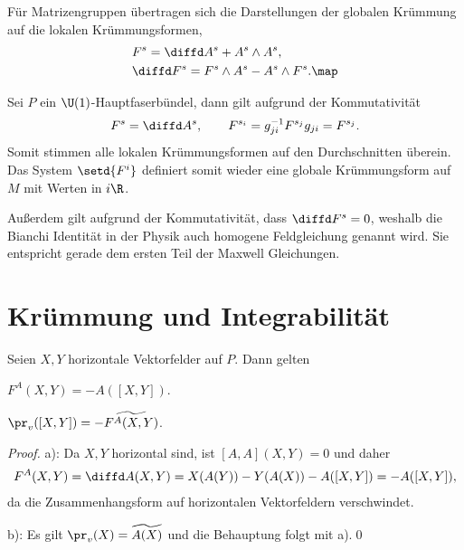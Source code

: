 \documentclass[%
	paper=a5,%
	fleqn,%
	DIV=18,%
	BCOR=0mm,
	fontsize=11pt,
	titlepage=false,%
	bibliography=totoc,
	DIV=18,%
	twoside=true,
	pdftitle=Riemannsche Geometrie,
	pdfauthor=Uwe Semmelmann,
	numbers=noendperiod]%
	{scrbook}
\begin{document}
\begin{rem}
Für Matrizengruppen übertragen sich die Darstellungen der globalen Krümmung auf
die lokalen Krümmungsformen,
\begin{align*}
&F^s = \diffd A^s + A^s\wedge A^s,\\
&\diffd F^s = F^s\wedge A^s - A^s \wedge F^s.\map
\end{align*}
\end{rem}

\begin{ex}
Sei $P$ ein $\U(1)$-Hauptfaserbündel, dann gilt aufgrund der Kommutativität
\begin{align*}
F^s = \diffd A^s,\qquad
F^{s_i} = g_{ji}^{-1}F^{s_j}g_{ji} = F^{s_j}.
\end{align*}
Somit stimmen alle lokalen Krümmungsformen auf den Durchschnitten überein. Das
System $\setd{F^i}$ definiert somit wieder eine globale Krümmungsform auf $M$
mit Werten in $i\R$.

Außerdem gilt aufgrund der Kommutativität, dass $\diffd F^s = 0$, weshalb die
Bianchi Identität in der Physik auch homogene Feldgleichung genannt wird. Sie
entspricht gerade dem ersten Teil der Maxwell Gleichungen.\bsp
\end{ex}


\section{Krümmung und Integrabilität}

\begin{prop}
\label{prop:Krümmung-v-Projektion}
Seien $X,Y$ horizontale Vektorfelder auf $P$. Dann gelten
\begin{propenum}
\item $F^A(X,Y) = -A([X,Y])$.
\item $\pr_v([X,Y]) = -\widetilde{F^A(X,Y)}$.\fish
\end{propenum}
\end{prop}
\begin{proof}
a): Da $X,Y$ horizontal sind, ist $[A,A](X,Y) = 0$ und daher
\begin{align*}
F^A(X,Y) = \diffd A(X,Y) = X(A(Y)) - Y(A(X)) - A([X,Y])
= -A([X,Y]),
\end{align*}
da die Zusammenhangsform auf horizontalen Vektorfeldern verschwindet.

b): Es gilt $\pr_v(X) = \widetilde{A(X)}$ und die Behauptung folgt mit a).\qed
\end{proof}
\end{document}
